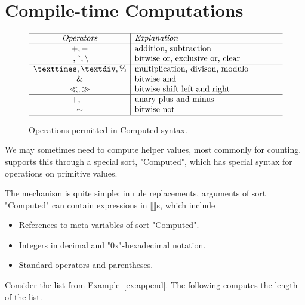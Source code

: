 \documentclass[11pt]{article} %
\begin{document}
\section{Compile-time Computations}
\label{sec:comp}

\begin{figure}[t]
  \begin{displaymath}
    \begin{array}{c|p{.5\linewidth}}
      \hline
      \textit{Operators} & \textit{Explanation} \\
      \hline
      +,- & \text{addition, subtraction} \\
      \mid, \caret, \backslash & \text{bitwise or, exclusive or, clear} \\
      \hline
      ×, ÷, \% & \text{multiplication, divison, modulo} \\
      \& & \text{bitwise and} \\
      \ll, \gg & \text{bitwise shift left and right} \\
      \hline
      +,- & \text{unary plus and minus}\\
      {\sim} & \text{bitwise not} \\
      \hline
    \end{array}
  \end{displaymath}
  \caption{Operations permitted in Computed syntax.}
  \label{fig:ops}
\end{figure}

We may sometimes need to compute helper values, most commonly for counting. \HAX supports this
through a special sort, "Computed", which has special syntax for operations on primitive values.

The mechanism is quite simple: in rule replacements, arguments of sort "Computed" can contain
expressions in ⟦⟧s, which include
\begin{itemize}
\item References to meta-variables of sort "Computed".
\item Integers in decimal and "0x"-hexadecimal notation.
\item Standard operators and parentheses.
\end{itemize}

\begin{example}[count]\label{ex:count}
  Consider the list from Example~\ref{ex:append}. The following computes the length of the list.
\end{example}
\end{document}
